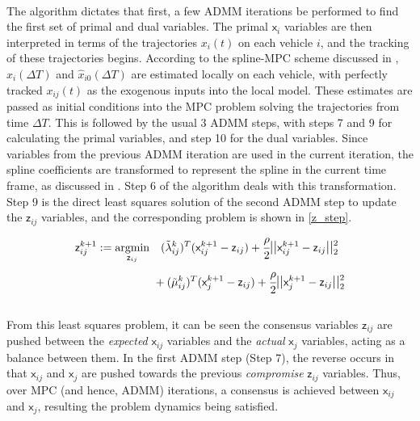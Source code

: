\documentclass[letterpaper, 10 pt, conference]{ieeeconf}
\DeclareMathOperator*{\argmin}{argmin}
\newcommand{\cx}{\textsf{x}}
\newcommand{\cz}{\textsf{z}}
\begin{document}
\\
\indent
The algorithm dictates that first, a few ADMM iterations be performed to find the first set of primal and dual variables. The primal $\cx_{i}$ variables are then interpreted in terms of the trajectories $x_i(t)$ on each vehicle $i$, and the tracking of these trajectories begins. According to the spline-MPC scheme discussed in \cite{c16}, $\hat{x}_i(\Delta T)$ and $\hat{x}_{i0}(\Delta T)$ are estimated locally on each vehicle, with perfectly tracked $x_{ij}(t)$ as the exogenous inputs into the local model. These estimates are passed as initial conditions into the MPC problem solving the trajectories from time $\Delta T$. This is followed by the usual 3 ADMM steps, with steps 7 and 9 for calculating the primal variables, and step 10 for the dual variables. Since variables from the previous ADMM iteration are used in the current iteration, the spline coefficients are transformed to represent the spline in the current time frame, as discussed in \cite{c16}. Step 6 of the algorithm deals with this transformation. Step 9 is the direct least squares solution of the second ADMM step to update the $\cz_{ij}$ variables, and the corresponding problem is shown in \eqref{z_step}.
\begin{equation}
\label{z_step}
\begin{aligned} \cz_{ij}^{k+1} &:=
 \argmin_{\cz_{ij}} \quad (\tilde{\lambda}^k_{ij})^T(\cx^{k+1}_{ij} - \cz_{ij}) + \cfrac{\rho}{2} \mathlarger{||}\cx^{k+1}_{ij} - \cz_{ij}\mathlarger{||}_2^2{{}} \\ & \qquad \quad \quad \quad
+ (\tilde{\mu}^k_{ij})^T(\cx^{k+1}_{j} - \cz_{ij}) +
\cfrac{\rho}{2} \mathlarger{||}\cx^{k+1}_{j} - \cz_{ij}\mathlarger{||}_2^2 \mathlarger{}
\end{aligned}
\end{equation}
\\
\indent
From this least squares problem, it can be seen the consensus variables $\cz_{ij}$ are pushed between the \textit{expected} $\cx_{ij}$ variables and the \textit{actual} $\cx_j$ variables, acting as a balance between them. In the first ADMM step (Step 7), the reverse occurs in that $\cx_{ij}$ and $\cx_j$ are pushed towards the previous \textit{compromise} $\cz_{ij}$ variables. Thus, over MPC (and hence, ADMM) iterations, a consensus is achieved between $\cx_{ij}$ and $\cx_j$, resulting the problem dynamics being satisfied.
\end{document}
